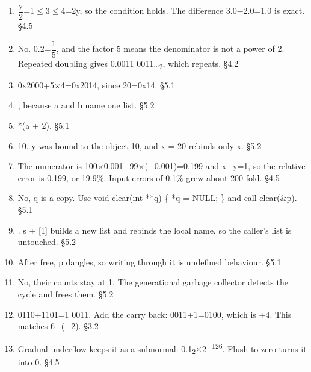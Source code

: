 \documentclass[11pt]{article}
\begin{document}
\begin{keepsection}
\begin{enumerate}
\item {\small\ensuremath{\dfrac{\mathrm{y}}{2}}}=1\ensuremath{\leq}3\ensuremath{\leq}4=2y, so the condition holds. The difference 3.0\ensuremath{-}2.0=1.0 is exact. \hfill{\small\color{FAUblue}§4.5}
\item No. 0.2={\small\ensuremath{\dfrac{1}{5}}}, and the factor 5 means the denominator is not a power of 2. Repeated doubling gives 0.0011 0011…\textsubscript{2}, which repeats. \hfill{\small\color{FAUblue}§4.2}
\item 0x2000+5\ensuremath{\times}4=0x2014, since 20=0x14. \hfill{\small\color{FAUblue}§5.1}
\item [1, 2, 3], because a and b name one list. \hfill{\small\color{FAUblue}§5.2}
\item *(a + 2). \hfill{\small\color{FAUblue}§5.1}
\item 10. y was bound to the object 10, and x = 20 rebinds only x. \hfill{\small\color{FAUblue}§5.2}
\item The numerator is 100\ensuremath{\times}0.001\ensuremath{-}99\ensuremath{\times}(\ensuremath{-}0.001)=0.199 and x\ensuremath{-}y=1, so the relative error is 0.199, or 19.9\%. Input errors of 0.1\% grew about 200-fold. \hfill{\small\color{FAUblue}§4.5}
\item No, q is a copy. Use void clear(int **q) \{ *q = NULL; \} and call clear(\&p). \hfill{\small\color{FAUblue}§5.1}
\item [0]. s + [1] builds a new list and rebinds the local name, so the caller’s list is untouched. \hfill{\small\color{FAUblue}§5.2}
\item After free, p dangles, so writing through it is undefined behaviour. \hfill{\small\color{FAUblue}§5.1}
\item No, their counts stay at 1. The generational garbage collector detects the cycle and frees them. \hfill{\small\color{FAUblue}§5.2}
\item 0110+1101=1 0011. Add the carry back: 0011+1=0100, which is +4. This matches 6+(\ensuremath{-}2). \hfill{\small\color{FAUblue}§3.2}
\item Gradual underflow keeps it as a subnormal: 0.1\textsubscript{2}\ensuremath{\times}2\textsuperscript{\ensuremath{-}126}. Flush-to-zero turns it into 0. \hfill{\small\color{FAUblue}§4.5}
\end{enumerate}

\end{keepsection}
\end{document}
